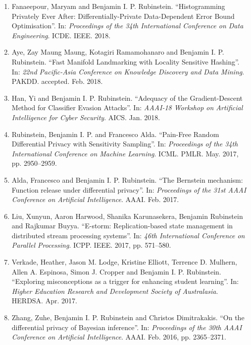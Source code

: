 \documentclass[a4paper,12pt]{article}
\begin{document}
\begin{enumerate}
\setcounter{enumi}{\value{list}}

\item Fanaeepour, Maryam and Benjamin I. P. Rubinstein.
``Histogramming Privately Ever After: Differentially-Private Data-Dependent Error Bound Optimisation''.
In: 
\emph{Proceedings of the 34th International Conference on Data Engineering}.
ICDE.
IEEE.
2018.

\item Aye, Zay Maung Maung, Kotagiri Ramamohanaro and Benjamin I. P. Rubinstein.
``Fast Manifold Landmarking with Locality Sensitive Hashing''.
In: 
\emph{22nd Pacific-Asia Conference on Knowledge Discovery and Data Mining}.
PAKDD.
accepted.
Feb. 2018.

\item Han, Yi and Benjamin I. P. Rubinstein.
``Adequacy of the Gradient-Descent Method for Classifier Evasion Attacks''.
In: 
\emph{AAAI-18 Workshop on Artificial Intelligence for Cyber Security}.
AICS.
Jan. 2018.

\item Rubinstein, Benjamin I. P. and Francesco Alda.
``Pain-Free Random Differential Privacy with Sensitivity Sampling''.
In: 
\emph{Proceedings of the 34th International Conference on Machine Learning}.
ICML.
PMLR.
May. 2017, pp. 2950--2959.

\item Alda, Francesco and Benjamin I. P. Rubinstein.
``The Bernstein mechanism: Function release under differential privacy''.
In: 
\emph{Proceedings of the 31st AAAI Conference on Artificial Intelligence}.
AAAI.
Feb. 2017.

\item Liu, Xunyun, Aaron Harwood, Shanika Karunasekera, Benjamin Rubinstein and Rajkumar Buyya.
``E-storm: Replication-based state management in distributed stream processing systems''.
In: 
\emph{46th International Conference on Parallel Processing}.
ICPP.
IEEE.
2017, pp. 571--580.

\item Verkade, Heather, Jason M. Lodge, Kristine Elliott, Terrence D. Mulhern, Allen A. Espinosa, Simon J. Cropper and Benjamin I. P. Rubinstein.
``Exploring misconceptions as a trigger for enhancing student learning''.
In: 
\emph{Higher Education Research and Development Society of Australasia}.
HERDSA.
Apr. 2017.

\item Zhang, Zuhe, Benjamin I. P. Rubinstein and Christos Dimitrakakis.
``On the differential privacy of Bayesian inference''.
In: 
\emph{Proceedings of the 30th AAAI Conference on Artificial Intelligence}.
AAAI.
Feb. 2016, pp. 2365--2371.


\end{enumerate}
\end{document}
